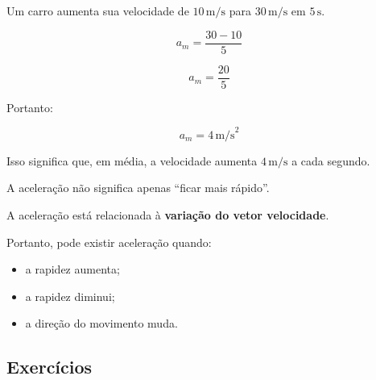 \documentclass[a4paper,12pt]{article}
\begin{document}
\begin{exemplo}

Um carro aumenta sua velocidade de $10\,\text{m/s}$ para
$30\,\text{m/s}$ em $5\,\text{s}$.

\[
a_m=
\frac{30-10}{5}
\]

\[
a_m=
\frac{20}{5}
\]

Portanto:

\[
\boxed{
a_m=4\,\text{m/s}^2
}
\]

Isso significa que, em média, a velocidade aumenta
$4\,\text{m/s}$ a cada segundo.

\end{exemplo}


\begin{atencao}

A aceleração não significa apenas ``ficar mais rápido''.

A aceleração está relacionada à \textbf{variação do vetor velocidade}.

Portanto, pode existir aceleração quando:

\begin{itemize}
    \item a rapidez aumenta;
    \item a rapidez diminui;
    \item a direção do movimento muda.
\end{itemize}

\end{atencao}


\subsection*{Exercícios}
\end{document}
